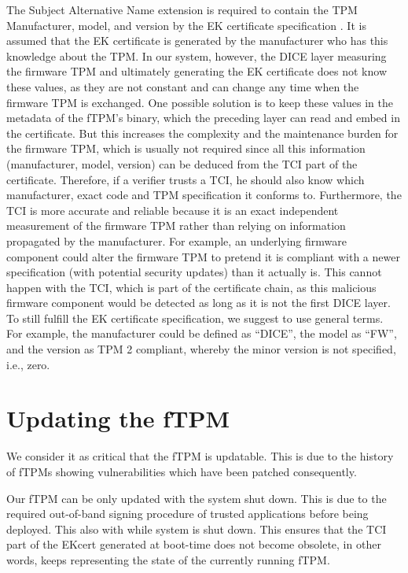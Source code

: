 The Subject Alternative Name extension is required to contain the TPM Manufacturer, model, and version by the EK certificate specification \cite{tcg-ek}.
It is assumed that the EK certificate is generated by the manufacturer who has this knowledge about the TPM.
In our system, however, the DICE layer measuring the firmware TPM and ultimately generating the EK certificate does not know these values, as they are not constant and can change any time when the firmware TPM is exchanged.
One possible solution is to keep these values in the metadata of the fTPM's binary, which the preceding layer can read and embed in the certificate.
But this increases the complexity and the maintenance burden for the firmware TPM, which is usually not required since all this information (manufacturer, model, version) can be deduced from the TCI part of the certificate.
Therefore, if a verifier trusts a TCI, he should also know which manufacturer, exact code and TPM specification it conforms to.
Furthermore, the TCI is more accurate and reliable because it is an exact independent measurement of the firmware TPM rather than relying on information propagated by the manufacturer.
For example, an underlying firmware component could alter the firmware TPM to pretend it is compliant with a newer specification (with potential security updates) than it actually is.
This cannot happen with the TCI, which is part of the certificate chain, as this malicious firmware component would be detected as long as it is not the first DICE layer.
To still fulfill the EK certificate specification, we suggest to use general terms.
For example, the manufacturer could be defined as ``DICE'', the model as ``FW'', and the version as TPM 2 compliant, whereby the minor version is not specified, i.e., zero.


\section{Updating the fTPM}

We consider it as critical that the \ac{fTPM} is updatable. This is due to the history of \acp{fTPM} showing vulnerabilities which have been patched consequently. %

Our \ac{fTPM} can be only updated with the system shut down. This is due to the required out-of-band signing procedure of trusted applications before being deployed. This also  with while system is shut down. This ensures that the TCI part of the EKcert generated at boot-time does not become obsolete, in other words, keeps representing the state of the currently running fTPM.

